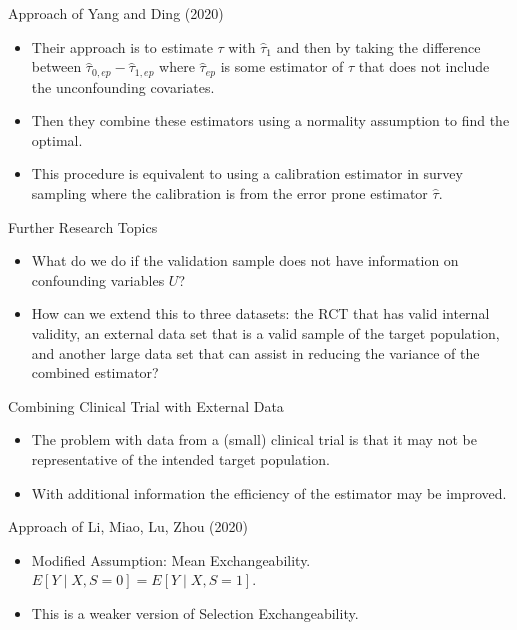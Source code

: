 \documentclass[handout]{beamer} %
\begin{document}
\begin{frame}{Approach of Yang and Ding (2020)}

\begin{itemize}
    \item Their approach is to estimate $\tau$ with $\hat \tau_1$ and then 
      by taking the difference between $\hat \tau_{0, ep} - \hat \tau_{1, ep}$
      where $\hat \tau_{ep}$ is some estimator of $\tau$ that does not include 
      the unconfounding covariates.
    \item Then they combine these estimators using a normality assumption to 
      find the optimal.
    \item This procedure is equivalent to using a calibration estimator in 
      survey sampling where the calibration is from the error prone estimator 
      $\hat \tau$.
\end{itemize}

\end{frame}

\begin{frame}{Further Research Topics}

\begin{itemize}
    \item What do we do if the validation sample does not have information on
      confounding variables $U$?
    \item How can we extend this to three datasets: the RCT that has valid 
      internal validity, an external data set that is a valid sample of the 
      target population, and another large data set that can assist in reducing 
      the variance of the combined estimator?
\end{itemize}

\end{frame}

\begin{frame}{Combining Clinical Trial with External Data}

\begin{itemize}
    \item The problem with data from a (small) clinical trial is that it may 
      not be representative of the intended target population.
    \item With additional information the efficiency of the estimator may be
      improved.
\end{itemize}

\end{frame}

\begin{frame}{Approach of Li, Miao, Lu, Zhou (2020)}

\begin{itemize}
  \item Modified Assumption: Mean Exchangeability. 
    $E[Y \mid X, S = 0] = E[Y \mid X, S = 1]$. 
  \item This is a weaker version of Selection Exchangeability.
\end{itemize}

\end{frame}
\end{document}

